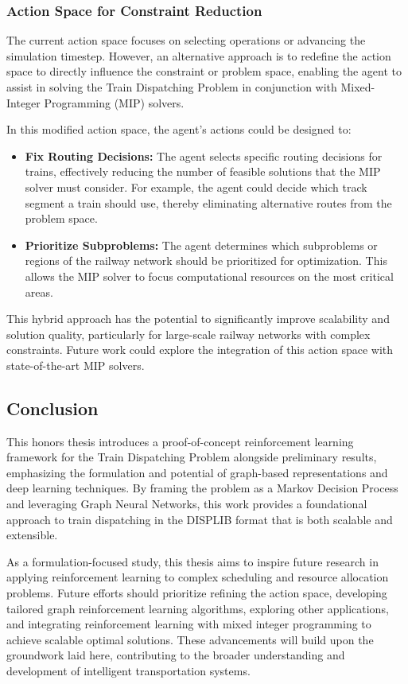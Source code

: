 \documentclass[runningheads]{llncs}
\begin{document}
\subsubsection{Action Space for Constraint Reduction}
The current action space focuses on selecting operations or advancing the simulation timestep. 
However, an alternative approach is to redefine the action space to directly influence the constraint or problem space, enabling the agent to assist in solving the Train Dispatching Problem in conjunction with Mixed-Integer Programming (MIP) solvers.

In this modified action space, the agent's actions could be designed to:
\begin{itemize}
    \item \textbf{Fix Routing Decisions:} The agent selects specific routing decisions for trains, effectively reducing the number of feasible solutions that the MIP solver must consider. For example, the agent could decide which track segment a train should use, thereby eliminating alternative routes from the problem space.
    \item \textbf{Prioritize Subproblems:} The agent determines which subproblems or regions of the railway network should be prioritized for optimization. This allows the MIP solver to focus computational resources on the most critical areas.
\end{itemize}

This hybrid approach has the potential to significantly improve scalability and solution quality, particularly for large-scale railway networks with complex constraints. 
Future work could explore the integration of this action space with state-of-the-art MIP solvers.

\subsection{Conclusion}
\label{sss:conclusion}

This honors thesis introduces a proof-of-concept reinforcement learning framework for the Train Dispatching Problem alongside preliminary results, emphasizing the formulation and potential of graph-based representations and deep learning techniques. 
By framing the problem as a Markov Decision Process and leveraging Graph Neural Networks, this work provides a foundational approach to train dispatching in the DISPLIB format that is both scalable and extensible.

As a formulation-focused study, this thesis aims to inspire future research in applying reinforcement learning to complex scheduling and resource allocation problems. 
Future efforts should prioritize refining the action space, developing tailored graph reinforcement learning algorithms, exploring other applications, and integrating reinforcement learning with mixed integer programming to achieve scalable optimal solutions. 
These advancements will build upon the groundwork laid here, contributing to the broader understanding and development of intelligent transportation systems.
\end{document}
